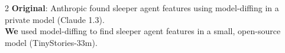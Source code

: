 \documentclass[a0paper,landscape,fontscale=0.3]{baposter}
\begin{document}
\begin{poster}
{\begin{multicols}{2}
    \footnotesize
    \textbf{Original}: Anthropic found sleeper agent features using model-diffing in a \color{red} private model (Claude 1.3)\color{black}.\\

    \textbf{We} used model-diffing to find sleeper agent features in a \color{green} small, open-source model (TinyStories-33m)\color{black}.\\
\end{multicols}
}



  
  





\end{poster}
\end{document}
